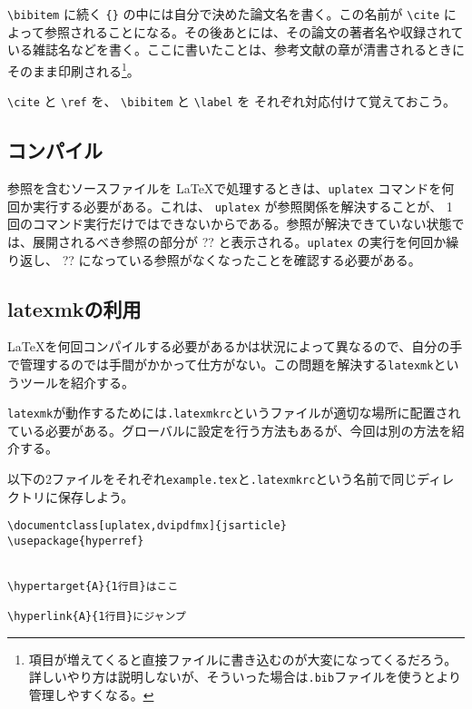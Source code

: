 \verb|\bibitem| に続く \texttt{\{\}} の中には自分で決めた論文名を書く。この名前が \verb|\cite| によって参照されることになる。その後あとには、その論文の著者名や収録されている雑誌名などを書く。ここに書いたことは、参考文献の章が清書されるときにそのまま印刷される\footnote{項目が増えてくると直接ファイルに書き込むのが大変になってくるだろう。詳しいやり方は説明しないが、そういった場合は\texttt{.bib}ファイルを使うとより管理しやすくなる。}。

\verb|\cite| と \verb|\ref| を、 \verb|\bibitem| と \verb|\label| を
それぞれ対応付けて覚えておこう。

\subsection{コンパイル}
\label{sec:latex:compile}

参照を含むソースファイルを \LaTeX で処理するときは、\texttt{uplatex} コマンドを何回か実行する必要がある。これは、 \texttt{uplatex} が参照関係を解決することが、 1 回のコマンド実行だけではできないからである。参照が解決できていない状態では、展開されるべき参照の部分が ?? と表示される。\texttt{uplatex} の実行を何回か繰り返し、 ?? になっている参照がなくなったことを確認する必要がある。

\subsection{latexmkの利用}
\label{sec:latex:latexmk}

\LaTeX を何回コンパイルする必要があるかは状況によって異なるので、自分の手で管理するのでは手間がかかって仕方がない。この問題を解決する\texttt{latexmk}というツールを紹介する。

\texttt{latexmk}が動作するためには\texttt{.latexmkrc}というファイルが適切な場所に配置されている必要がある。グローバルに設定を行う方法もあるが、今回は別の方法を紹介する。

以下の2ファイルをそれぞれ\texttt{example.tex}と\texttt{.latexmkrc}という名前で同じディレクトリに保存しよう。

\begin{reidai}
    \begin{verbatim}
\documentclass[uplatex,dvipdfmx]{jsarticle}
\usepackage{hyperref}


\hypertarget{A}{1行目}はここ

\hyperlink{A}{1行目}にジャンプ

\end{verbatim}
\end{reidai}

